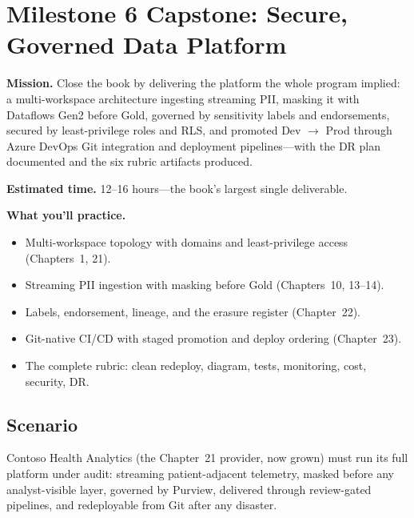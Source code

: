 \section{Milestone 6 Capstone: Secure, Governed Data Platform}\label{sec:ch24-capstone}

\begin{capstonebox}
\textbf{Mission.} Close the book by delivering the platform the whole program implied: a multi-workspace architecture ingesting streaming PII, masking it with Dataflows Gen2 before Gold, governed by sensitivity labels and endorsements, secured by least-privilege roles and RLS, and promoted Dev $\rightarrow$ Prod through Azure DevOps Git integration and deployment pipelines---with the DR plan documented and the six rubric artifacts produced.

\textbf{Estimated time.} 12--16 hours---the book's largest single deliverable.

\textbf{What you'll practice.}
\begin{itemize}
    \item Multi-workspace topology with domains and least-privilege access (Chapters~1, 21).
    \item Streaming PII ingestion with masking before Gold (Chapters~10, 13--14).
    \item Labels, endorsement, lineage, and the erasure register (Chapter~22).
    \item Git-native CI/CD with staged promotion and deploy ordering (Chapter~23).
    \item The complete rubric: clean redeploy, diagram, tests, monitoring, cost, security, DR.
\end{itemize}
\end{capstonebox}

\subsection*{Scenario}
Contoso Health Analytics (the Chapter~21 provider, now grown) must run its full platform under audit: streaming patient-adjacent telemetry, masked before any analyst-visible layer, governed by Purview, delivered through review-gated pipelines, and redeployable from Git after any disaster.

